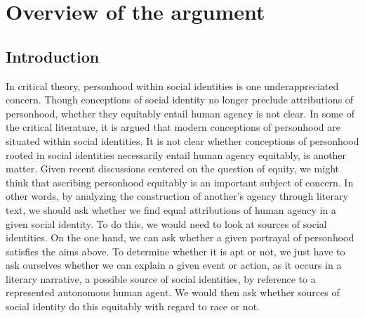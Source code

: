 \documentclass[phdthesis,12pt,final]{wuthesis}
\theoremstyle{definition}
\theoremstyle{definition}
\theoremstyle{definition}
\theoremstyle{definition}
\theoremstyle{remark}
\begin{document}
\section{Overview of the argument}\label{overview-of-the-argument}

\begin{Shaded}
\begin{Highlighting}[]

\end{Highlighting}
\end{Shaded}

\subsection{Introduction}\label{introduction-1}

In critical theory, personhood within social identities is one underappreciated concern. Though conceptions of social identity no longer preclude attributions of personhood, whether they equitably entail human agency is not clear. In some of the critical literature, it is argued that modern conceptions of personhood are situated within social identities. It is not clear whether conceptions of personhood rooted in social identities necessarily entail human agency equitably, is another matter. Given recent discussions centered on the question of equity, we might think that ascribing personhood equitably is an important subject of concern. In other words, by analyzing the construction of another's agency through literary text, we should ask whether we find equal attributions of human agency in a given social identity. To do this, we would need to look at sources of social identities. On the one hand, we can ask whether a given portrayal of personhood satisfies the aims above. To determine whether it is apt or not, we just have to ask ourselves whether we can explain a given event or action, as it occurs in a literary narrative, a possible source of social identities, by reference to a represented autonomous human agent. We would then ask whether sources of social identity do this equitably with regard to race or not.
\end{document}
